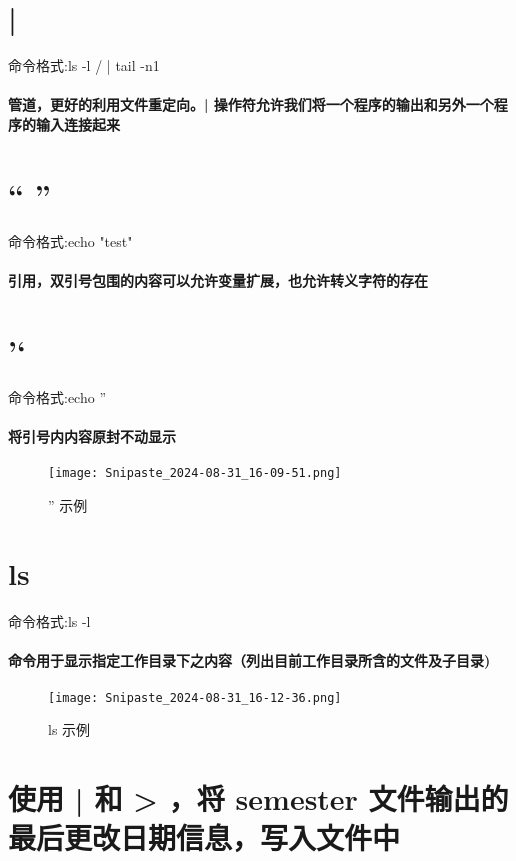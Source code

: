 \documentclass[a4paper, 12pt]{article}
\begin{document}
	\section{| }
	{\color{blue} 命令格式:ls -l / | tail -n1}
	\paragraph{管道，更好的利用文件重定向。| 操作符允许我们将一个程序的输出和另外一个程序的输入连接起来}
		
	\section{“ ”}
	{\color{blue} 命令格式:echo "test"}
	\paragraph{引用，双引号包围的内容可以允许变量扩展，也允许转义字符的存在}
	
	\section{’‘}
	{\color{blue} 命令格式:echo ''}
	\paragraph{将引号内内容原封不动显示}
    \begin{figure}[h]
        \centering
        \texttt{[image: Snipaste\_2024-08-31\_16-09-51.png]}
        \caption{'' 示例}
        \label{fig:''示例}
    \end{figure}

	\section{ls}
	{\color{blue} 命令格式:ls -l}
	\paragraph{命令用于显示指定工作目录下之内容（列出目前工作目录所含的文件及子目录)}
    \begin{figure}[h]
        \centering
        \texttt{[image: Snipaste\_2024-08-31\_16-12-36.png]}
        \caption{ls 示例}
        \label{fig:ls示例}
    \end{figure}

    \section{使用 | 和 > ，将 semester 文件输出的最后更改日期信息，写入文件中}
\end{document}
